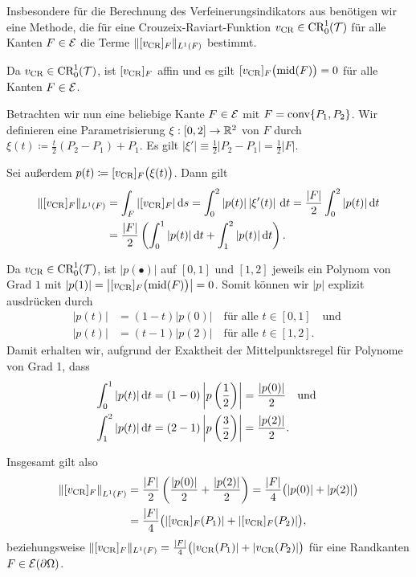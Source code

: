 Insbesondere für die Berechnung des Verfeinerungsindikators aus
 benötigen wir eine Methode, die
für eine Crouzeix-Raviart-Funktion
$v_\textup{CR}\in\textup{CR}^1_0(\mathcal{T})$
für alle Kanten $F\in\mathcal{E}$ die Terme $\Vert [v_\textup{CR}]_F\Vert_{L^1(F)}$ 
bestimmt.

Da $v_\textup{CR}\in\textup{CR}^1_0(\mathcal{T})$, ist $[v_\textup{CR}]_F$ affin und es gilt
$[v_\textup{CR}]_F\big(\textup{mid}(F)\big)=0$ für alle Kanten $F\in\mathcal{E}$.

Betrachten wir nun eine beliebige Kante $F\in\mathcal{E}$ mit $F=\textup{conv}\{P_1,P_2\}$. 
Wir definieren eine Parametrisierung $\xi:[0,2]\to\mathbb{R}^2$ von $F$ durch
$\xi(t)\coloneqq \frac{t}{2}(P_2-P_1)+P_1$. 
Es gilt $\left|\xi'\right|\equiv \frac{1}{2}|P_2-P_1|=\frac{1}{2}|F|$.

Sei außerdem
$p(t)\coloneqq [v_\textup{CR}]_F\big(\xi(t)\big)$. Dann gilt
\begin{align*}
  \Vert [v_\textup{CR}]_F\Vert_{L^1(F)} 
  &=
  \int_F |[v_\textup{CR}]_F|\,\mathrm{d}s 
  = \int_0^2 |p(t)|\left|\xi'(t)\right|\,\mathrm{d}t
  = \frac{|F|}{2}\int_0^2 |p(t)|\,\mathrm{d}t\\
  &= \frac{|F|}{2}\left(\int_0^1 |p(t)|\,\mathrm{d}t + \int_1^2 |p(t)|\,\mathrm{d}t\right).
\end{align*}

Da $v_\textup{CR}\in\textup{CR}^1_0(\mathcal{T})$, ist $|p(\bullet)|$ auf $[0,1]$ und $[1,2]$ jeweils
ein Polynom von Grad $1$ mit $|p(1)|=\left|[v_\textup{CR}]_F\big(\textup{mid}(F)\big)\right|=0$. 
Somit können wir $|p|$ explizit ausdrücken durch
\begin{align*}
  |p(t)|&=(1-t)|p(0)| \quad\text{für alle }t\in[0,1] \quad\text{und }\\
  |p(t)|&=(t-1)|p(2)| \quad\text{für alle }t\in[1,2].
\end{align*}
Damit erhalten wir, aufgrund der Exaktheit der Mittelpunktsregel für Polynome
von Grad 1, dass
\begin{align*}
  \int_0^1 |p(t)|\,\mathrm{d}t 
  &= 
  (1-0)\left|p\left( \frac{1}{2} \right)\right|
  =
  \frac{|p(0)|}{2}\quad\text{und }\\
  \int_1^2 |p(t)|\,\mathrm{d}t 
  &= 
  (2-1)\left|p\left( \frac{3}{2} \right)\right|
  =
  \frac{|p(2)|}{2}.
\end{align*}

Insgesamt gilt also
\begin{align*}
  \left\Vert [v_\textup{CR}]_F\right\Vert_{L^1(F)} 
  &=
  \frac{|F|}{2}\left(\frac{|p(0)|}{2} + \frac{|p(2)|}{2}\right)
  =
  \frac{|F|}{4}\big(|p(0)|+|p(2)|\big)\\
  &= 
  \frac{|F|}{4}\big(|[v_\textup{CR}]_F(P_1)|+|[v_\textup{CR}]_F(P_2)|\big),
\end{align*}
beziehungsweise 
  $\Vert [v_\textup{CR}]_F\Vert_{L^1(F)} =
  \frac{|F|}{4}\big(|v_\textup{CR}(P_1)|+|v_\textup{CR}(P_2)|\big)$ für eine Randkanten
  $F\in\mathcal{E}(\partial\Omega)$.

